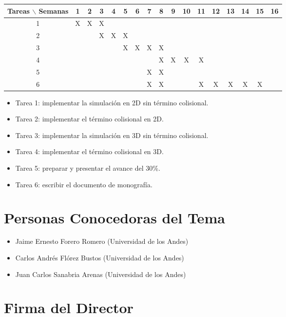 \documentclass[12pt]{article}
\begin{document}
\begin{table}[htb]
	\begin{tabular}{|c|cccccccccccccccc| }
	\hline
	Tareas $\backslash$ Semanas & 1 & 2 & 3 & 4 & 5 & 6 & 7 & 8 & 9 & 10 & 11 & 12 & 13 & 14 & 15 & 16  \\
	\hline
	1 & X & X & X  &   &   &   &   &  &  &   &   &   &   &   &   &   \\
	2 &   &  & X & X & X &  &  &   &   &  &  &  &   &  &  &   \\
	3 &   &   &   &  & X  & X  & X  & X &   &   &   &  &   &   &  &   \\
	4 &  &  &  &  &  &  &  & X & X & X & X &   &   &   &   &   \\
    5 &  &  &  &  &  &  & X & X &  &  &  &   &   &   &   &   \\
	6 &   &   &   &   &  &   &  X & X  &  &   &  X & X &  X & X  & X &   \\
	\hline
	\end{tabular}
\end{table}
\vspace{1mm}

\begin{itemize}
	\item Tarea 1: implementar la simulación en 2D sin término colisional.
	\item Tarea 2: implementar el término colisional en 2D.
	\item Tarea 3: implementar la simulación en 3D sin término colisional.
    \item Tarea 4: implementar el término colisional en 3D.
    \item Tarea 5: preparar y presentar el avance del 30\%.
    \item Tarea 6: escribir el documento de monografía.
    
\end{itemize}

\section{Personas Conocedoras del Tema}


\begin{itemize}
	\item Jaime Ernesto Forero Romero (Universidad de los Andes)
	\item Carlos Andrés Flórez Bustos (Universidad de los Andes)
	\item Juan Carlos Sanabria Arenas (Universidad de los Andes)
\end{itemize}


{}


\section*{Firma del Director}
\vspace{1.5cm}
\end{document}
